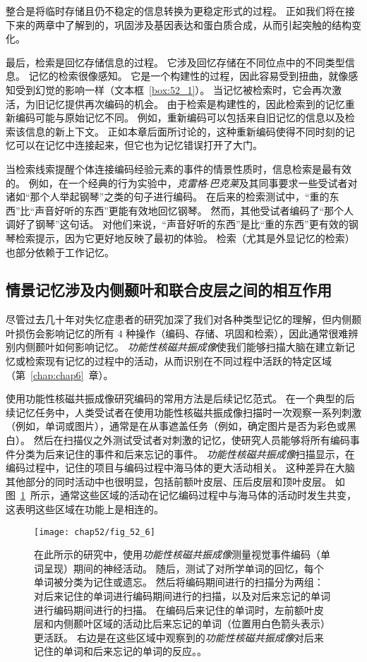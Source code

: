 整合是将临时存储且仍不稳定的信息转换为更稳定形式的过程。
正如我们将在接下来的两章中了解到的，巩固涉及基因表达和蛋白质合成，从而引起突触的结构变化。


最后，检索是回忆存储信息的过程。
它涉及回忆存储在不同位点中的不同类型信息。
记忆的检索很像感知。
它是一个构建性的过程，因此容易受到扭曲，就像感知受到幻觉的影响一样（文本框~\ref{box:52_1}）。
当记忆被检索时，它会再次激活，为旧记忆提供再次编码的机会。
由于检索是构建性的，因此检索到的记忆重新编码可能与原始记忆不同。
例如，重新编码可以包括来自旧记忆的信息以及检索该信息的新上下文。
正如本章后面所讨论的，这种重新编码使得不同时刻的记忆可以在记忆中连接起来，但它也为记忆错误打开了大门。


当检索线索提醒个体连接编码经验元素的事件的情景性质时，信息检索是最有效的。
例如，在一个经典的行为实验中，\textit{克雷格$\cdot$巴克莱}及其同事要求一些受试者对诸如“那个人举起钢琴”之类的句子进行编码。
在后来的检索测试中，“重的东西”比“声音好听的东西”更能有效地回忆钢琴。
然而，其他受试者编码了“那个人调好了钢琴”这句话。
对他们来说，“声音好听的东西”是比“重的东西”更有效的钢琴检索提示，因为它更好地反映了最初的体验。
检索（尤其是外显记忆的检索）也部分依赖于工作记忆。



\subsection{情景记忆涉及内侧颞叶和联合皮层之间的相互作用}

尽管过去几十年对失忆症患者的研究加深了我们对各种类型记忆的理解，但内侧颞叶损伤会影响记忆的所有 4 种操作（编码、存储、巩固和检索），因此通常很难辨别内侧颞叶如何影响记忆。
\textit{功能性核磁共振成像}使我们能够扫描大脑在建立新记忆或检索现有记忆的过程中的活动，从而识别在不同过程中活跃的特定区域（第~\ref{chap:chap6}~章）。


使用功能性核磁共振成像研究编码的常用方法是后续记忆范式。
在一个典型的后续记忆任务中，人类受试者在使用功能性核磁共振成像扫描时一次观察一系列刺激（例如，单词或图片），通常是在从事遮盖任务（例如，确定图片是否为彩色或黑白）。
然后在扫描仪之外测试受试者对刺激的记忆，使研究人员能够将所有编码事件分类为后来记住的事件和后来忘记的事件。
\textit{功能性核磁共振成像}扫描显示，在编码过程中，记住的项目与编码过程中海马体的更大活动相关。
这种差异在大脑其他部分的同时活动中也很明显，包括前额叶皮层、压后皮层和顶叶皮层。
如图~\ref{fig:52_6}~所示，通常这些区域的活动在记忆编码过程中与海马体的活动时发生共变，这表明这些区域在功能上是相连的。


\begin{figure}[htbp]
	\centering
	\texttt{[image: chap52/fig\_52\_6]}
	\caption{在此所示的研究中，使用\textit{功能性核磁共振成像}测量视觉事件编码（单词呈现）期间的神经活动。
		随后，测试了对所学单词的回忆，每个单词被分类为记住或遗忘。
		然后将编码期间进行的扫描分为两组：对后来记住的单词进行编码期间进行的扫描，以及对后来忘记的单词进行编码期间进行的扫描。
		在编码后来记住的单词时，左前额叶皮层和内侧颞叶区域的活动比后来忘记的单词（位置用白色箭头表示）更活跃。
		右边是在这些区域中观察到的\textit{功能性核磁共振成像}对后来记住的单词和后来忘记的单词的反应。\cite{wagner1998building}。}
	\label{fig:52_6}
\end{figure}


